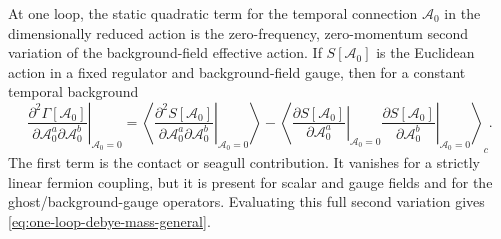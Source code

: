 \begin{lemma}
\label{lem:debye-mass-origin}
At one loop, the static quadratic term for the temporal connection
\(\mathcal A_0\) in the dimensionally reduced action is the zero-frequency,
zero-momentum second variation of the background-field effective action.  If
\(S[\mathcal A_0]\) is the Euclidean action in a fixed regulator and
background-field gauge, then for a constant temporal
background
\begin{equation}
  \left.
  \frac{\partial^2\Gamma[\mathcal A_0]}
  {\partial \mathcal A_0^a\partial \mathcal A_0^b}
  \right|_{\mathcal A_0=0}
  =
  \left\langle
  \left.
  \frac{\partial^2S[\mathcal A_0]}
  {\partial \mathcal A_0^a\partial \mathcal A_0^b}
  \right|_{\mathcal A_0=0}
  \right\rangle
  -
  \left\langle
  \left.
  \frac{\partial S[\mathcal A_0]}{\partial \mathcal A_0^a}
  \right|_{\mathcal A_0=0}
  \left.
  \frac{\partial S[\mathcal A_0]}{\partial \mathcal A_0^b}
  \right|_{\mathcal A_0=0}
  \right\rangle_c .
  \label{eq:debye-background-second-variation}
\end{equation}
The first term is the contact or seagull contribution.  It vanishes for a
strictly linear fermion coupling, but it is present for scalar and gauge
fields and for the ghost/background-gauge operators.  Evaluating this full
second variation gives \eqref{eq:one-loop-debye-mass-general}.
\end{lemma}

